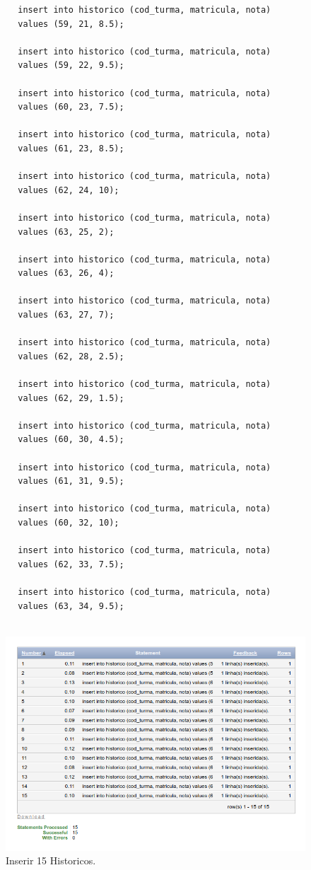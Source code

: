\documentclass[
article,			%
11pt,				%
oneside,			%
a4paper,			%
english,			%
brazil,				%
sumario=tradicional
]{abntex2}
\begin{document}
\begin{enumerate}
		\begin{verbatim}
		insert into historico (cod_turma, matricula, nota)
		values (59, 21, 8.5);
		
		insert into historico (cod_turma, matricula, nota)
		values (59, 22, 9.5);
		
		insert into historico (cod_turma, matricula, nota)
		values (60, 23, 7.5);
		
		insert into historico (cod_turma, matricula, nota)
		values (61, 23, 8.5);
		
		insert into historico (cod_turma, matricula, nota)
		values (62, 24, 10);
		
		insert into historico (cod_turma, matricula, nota)
		values (63, 25, 2);
		
		insert into historico (cod_turma, matricula, nota)
		values (63, 26, 4);
		
		insert into historico (cod_turma, matricula, nota)
		values (63, 27, 7);
		
		insert into historico (cod_turma, matricula, nota)
		values (62, 28, 2.5);
		
		insert into historico (cod_turma, matricula, nota)
		values (62, 29, 1.5);
		
		insert into historico (cod_turma, matricula, nota)
		values (60, 30, 4.5);
		
		insert into historico (cod_turma, matricula, nota)
		values (61, 31, 9.5);
		
		insert into historico (cod_turma, matricula, nota)
		values (60, 32, 10);
		
		insert into historico (cod_turma, matricula, nota)
		values (62, 33, 7.5);
		
		insert into historico (cod_turma, matricula, nota)
		values (63, 34, 9.5);​
		​
		\end{verbatim}
		\vspace{0.0cm}
		\begin{center}
			\begin{figure}[H]
				\centering
				\includegraphics[scale=0.5]{./at-05.png}
				\caption{Inserir 15 Historicos.}
				\label{rota-1}
			\end{figure}
		\end{center}
\end{enumerate}
	
\end{document}
